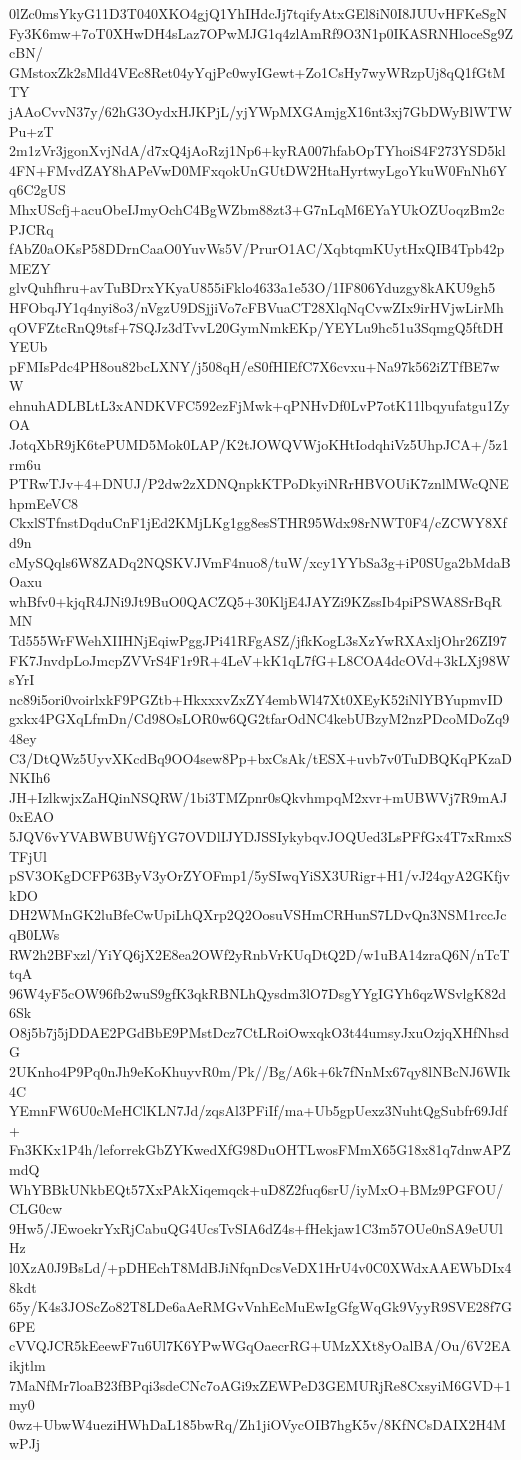 0lZc0msYkyG11D3T040XKO4gjQ1YhIHdcJj7tqifyAtxGEl8iN0I8JUUvHFKeSgN
Fy3K6mw+7oT0XHwDH4sLaz7OPwMJG1q4zlAmRf9O3N1p0IKASRNHloceSg9ZcBN/
GMstoxZk2sMld4VEc8Ret04yYqjPc0wyIGewt+Zo1CsHy7wyWRzpUj8qQ1fGtMTY
jAAoCvvN37y/62hG3OydxHJKPjL/yjYWpMXGAmjgX16nt3xj7GbDWyBlWTWPu+zT
2m1zVr3jgonXvjNdA/d7xQ4jAoRzj1Np6+kyRA007hfabOpTYhoiS4F273YSD5kl
4FN+FMvdZAY8hAPeVwD0MFxqokUnGUtDW2HtaHyrtwyLgoYkuW0FnNh6Yq6C2gUS
MhxUScfj+acuObeIJmyOchC4BgWZbm88zt3+G7nLqM6EYaYUkOZUoqzBm2cPJCRq
fAbZ0aOKsP58DDrnCaaO0YuvWs5V/PrurO1AC/XqbtqmKUytHxQIB4Tpb42pMEZY
glvQuhfhru+avTuBDrxYKyaU855iFklo4633a1e53O/1IF806Yduzgy8kAKU9gh5
HFObqJY1q4nyi8o3/nVgzU9DSjjiVo7cFBVuaCT28XlqNqCvwZIx9irHVjwLirMh
qOVFZtcRnQ9tsf+7SQJz3dTvvL20GymNmkEKp/YEYLu9hc51u3SqmgQ5ftDHYEUb
pFMIsPdc4PH8ou82bcLXNY/j508qH/eS0fHIEfC7X6cvxu+Na97k562iZTfBE7wW
ehnuhADLBLtL3xANDKVFC592ezFjMwk+qPNHvDf0LvP7otK11lbqyufatgu1ZyOA
JotqXbR9jK6tePUMD5Mok0LAP/K2tJOWQVWjoKHtIodqhiVz5UhpJCA+/5z1rm6u
PTRwTJv+4+DNUJ/P2dw2zXDNQnpkKTPoDkyiNRrHBVOUiK7znlMWcQNEhpmEeVC8
CkxlSTfnstDqduCnF1jEd2KMjLKg1gg8esSTHR95Wdx98rNWT0F4/cZCWY8Xfd9n
cMySQqls6W8ZADq2NQSKVJVmF4nuo8/tuW/xcy1YYbSa3g+iP0SUga2bMdaBOaxu
whBfv0+kjqR4JNi9Jt9BuO0QACZQ5+30KljE4JAYZi9KZssIb4piPSWA8SrBqRMN
Td555WrFWehXIIHNjEqiwPggJPi41RFgASZ/jfkKogL3sXzYwRXAxljOhr26ZI97
FK7JnvdpLoJmcpZVVrS4F1r9R+4LeV+kK1qL7fG+L8COA4dcOVd+3kLXj98WsYrI
nc89i5ori0voirlxkF9PGZtb+HkxxxvZxZY4embWl47Xt0XEyK52iNlYBYupmvID
gxkx4PGXqLfmDn/Cd98OsLOR0w6QG2tfarOdNC4kebUBzyM2nzPDcoMDoZq948ey
C3/DtQWz5UyvXKcdBq9OO4sew8Pp+bxCsAk/tESX+uvb7v0TuDBQKqPKzaDNKIh6
JH+IzlkwjxZaHQinNSQRW/1bi3TMZpnr0sQkvhmpqM2xvr+mUBWVj7R9mAJ0xEAO
5JQV6vYVABWBUWfjYG7OVDlIJYDJSSIykybqvJOQUed3LsPFfGx4T7xRmxSTFjUl
pSV3OKgDCFP63ByV3yOrZYOFmp1/5ySIwqYiSX3URigr+H1/vJ24qyA2GKfjvkDO
DH2WMnGK2luBfeCwUpiLhQXrp2Q2OosuVSHmCRHunS7LDvQn3NSM1rccJcqB0LWs
RW2h2BFxzl/YiYQ6jX2E8ea2OWf2yRnbVrKUqDtQ2D/w1uBA14zraQ6N/nTcTtqA
96W4yF5cOW96fb2wuS9gfK3qkRBNLhQysdm3lO7DsgYYgIGYh6qzWSvlgK82d6Sk
O8j5b7j5jDDAE2PGdBbE9PMstDcz7CtLRoiOwxqkO3t44umsyJxuOzjqXHfNhsdG
2UKnho4P9Pq0nJh9eKoKhuyvR0m/Pk//Bg/A6k+6k7fNnMx67qy8lNBcNJ6WIk4C
YEmnFW6U0cMeHClKLN7Jd/zqsAl3PFiIf/ma+Ub5gpUexz3NuhtQgSubfr69Jdf+
Fn3KKx1P4h/leforrekGbZYKwedXfG98DuOHTLwosFMmX65G18x81q7dnwAPZmdQ
WhYBBkUNkbEQt57XxPAkXiqemqck+uD8Z2fuq6srU/iyMxO+BMz9PGFOU/CLG0cw
9Hw5/JEwoekrYxRjCabuQG4UcsTvSIA6dZ4s+fHekjaw1C3m57OUe0nSA9eUUlHz
l0XzA0J9BsLd/+pDHEchT8MdBJiNfqnDcsVeDX1HrU4v0C0XWdxAAEWbDIx48kdt
65y/K4s3JOScZo82T8LDe6aAeRMGvVnhEcMuEwIgGfgWqGk9VyyR9SVE28f7G6PE
cVVQJCR5kEeewF7u6Ul7K6YPwWGqOaecrRG+UMzXXt8yOalBA/Ou/6V2EAikjtlm
7MaNfMr7loaB23fBPqi3sdeCNc7oAGi9xZEWPeD3GEMURjRe8CxsyiM6GVD+1my0
0wz+UbwW4ueziHWhDaL185bwRq/Zh1jiOVycOIB7hgK5v/8KfNCsDAIX2H4MwPJj

